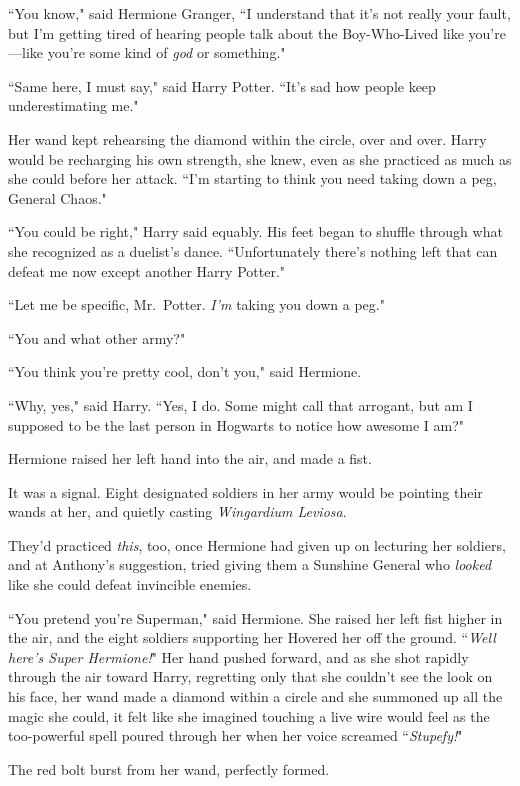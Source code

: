 ``You know," said Hermione Granger, ``I understand that it's not really your fault, but I'm getting tired of hearing people talk about the Boy-Who-Lived like you're—like you're some kind of \emph{god} or something."

``Same here, I must say," said Harry Potter. ``It's sad how people keep underestimating me."

Her wand kept rehearsing the diamond within the circle, over and over. Harry would be recharging his own strength, she knew, even as she practiced as much as she could before her attack. ``I'm starting to think you need taking down a peg, General Chaos."

``You could be right," Harry said equably. His feet began to shuffle through what she recognized as a duelist's dance. ``Unfortunately there's nothing left that can defeat me now except another Harry Potter."

``Let me be specific, Mr.~Potter. \emph{I'm} taking you down a peg."

``You and what other army?"

``You think you're pretty cool, don't you," said Hermione.

``Why, yes," said Harry. ``Yes, I do. Some might call that arrogant, but am I supposed to be the last person in Hogwarts to notice how awesome I am?"

Hermione raised her left hand into the air, and made a fist.

It was a signal. Eight designated soldiers in her army would be pointing their wands at her, and quietly casting \emph{Wingardium Leviosa}.

They'd practiced \emph{this}, too, once Hermione had given up on lecturing her soldiers, and at Anthony's suggestion, tried giving them a Sunshine General who \emph{looked} like she could defeat invincible enemies.

``You pretend you're Superman," said Hermione. She raised her left fist higher in the air, and the eight soldiers supporting her Hovered her off the ground. ``\emph{Well here's Super Hermione!}" Her hand pushed forward, and as she shot rapidly through the air toward Harry, regretting only that she couldn't see the look on his face, her wand made a diamond within a circle and she summoned up all the magic she could, it felt like she imagined touching a live wire would feel as the too-powerful spell poured through her when her voice screamed ``\emph{Stupefy!}"

The red bolt burst from her wand, perfectly formed.

